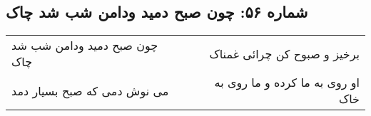 \begin{center}
\section*{شماره ۵۶: چون صبح دمید ودامن شب شد چاک}
\label{sec:056}
\begin{longtable}{l p{0.5cm} r}
چون صبح دمید ودامن شب شد چاک
&&
برخیز و صبوح کن چرائی غمناک
\\
می نوش دمی که صبح بسیار دمد
&&
او روی به ما کرده و ما روی به خاک
\\
\end{longtable}
\end{center}
